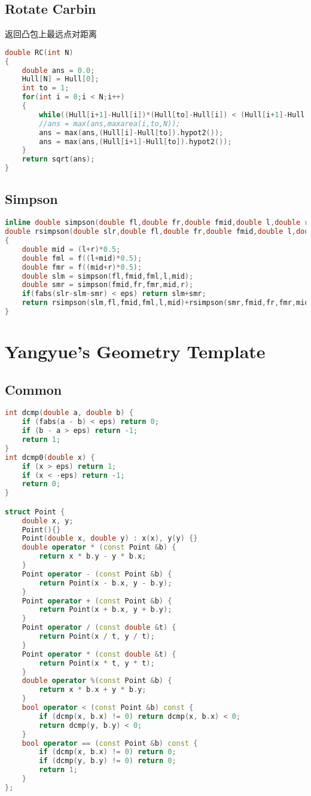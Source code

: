 \subsection{Rotate Carbin}
返回凸包上最远点对距离
\begin{lstlisting}[language=C++]
double RC(int N)
{
	double ans = 0.0;
	Hull[N] = Hull[0];
	int to = 1;
	for(int i = 0;i < N;i++)
	{
		while((Hull[i+1]-Hull[i])*(Hull[to]-Hull[i]) < (Hull[i+1]-Hull[i])*(Hull[to+1]-Hull[i])) to = (to+1)%N;
		//ans = max(ans,maxarea(i,to,N));
		ans = max(ans,(Hull[i]-Hull[to]).hypot2());
		ans = max(ans,(Hull[i+1]-Hull[to]).hypot2());
	}
	return sqrt(ans);
}
\end{lstlisting}
\subsection{Simpson}
\begin{lstlisting}[language=C++]
inline double simpson(double fl,double fr,double fmid,double l,double r) { return (fl+fr+4.0*fmid)*(r-l)/6.0; }
double rsimpson(double slr,double fl,double fr,double fmid,double l,double r)
{
	double mid = (l+r)*0.5;
	double fml = f((l+mid)*0.5);
	double fmr = f((mid+r)*0.5);
	double slm = simpson(fl,fmid,fml,l,mid);
	double smr = simpson(fmid,fr,fmr,mid,r);
	if(fabs(slr-slm-smr) < eps) return slm+smr;
	return rsimpson(slm,fl,fmid,fml,l,mid)+rsimpson(smr,fmid,fr,fmr,mid,r);
}
\end{lstlisting}

\section{Yangyue's Geometry Template}
\subsection{Common}
\begin{lstlisting}[language=C++]
int dcmp(double a, double b) {
	if (fabs(a - b) < eps) return 0;
	if (b - a > eps) return -1;
	return 1;
}
int dcmp0(double x) {
	if (x > eps) return 1;
	if (x < -eps) return -1;
	return 0;
}

struct Point {
	double x, y;
	Point(){}
	Point(double x, double y) : x(x), y(y) {}
	double operator * (const Point &b) {
		return x * b.y - y * b.x;
	}
	Point operator - (const Point &b) {
		return Point(x - b.x, y - b.y);
	}
	Point operator + (const Point &b) {
		return Point(x + b.x, y + b.y);
	}
	Point operator / (const double &t) {
		return Point(x / t, y / t);
	}
	Point operator * (const double &t) {
		return Point(x * t, y * t);
	}
	double operator %(const Point &b) {
		return x * b.x + y * b.y;
	}
	bool operator < (const Point &b) const {
		if (dcmp(x, b.x) != 0) return dcmp(x, b.x) < 0;
		return dcmp(y, b.y) < 0;
	}
	bool operator == (const Point &b) const {
		if (dcmp(x, b.x) != 0) return 0;
		if (dcmp(y, b.y) != 0) return 0;
		return 1;
	}
};
\end{lstlisting}

